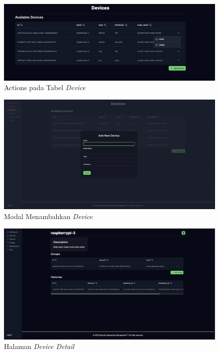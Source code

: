 \begin{figure}[ht]
  \centering
  \includegraphics[width=1\textwidth]{resources/chapter-4/dashboard/device-page-actions.jpg}
  \caption{Actions pada Tabel \textit{Device}}
  \label{fig:halaman-device-actions}
\end{figure}

\begin{figure}[ht]
  \centering
  \includegraphics[width=1\textwidth]{resources/chapter-4/dashboard/device-page-add.jpg}
  \caption{Modal Menambahkan \textit{Device}}
  \label{fig:halaman-device-add}
\end{figure}

\begin{figure}[ht]
  \centering
  \includegraphics[width=1\textwidth]{resources/chapter-4/dashboard/device-detail-page.jpg}
  \caption{Halaman \textit{Device Detail}}
  \label{fig:halaman-device-detail}
\end{figure}

